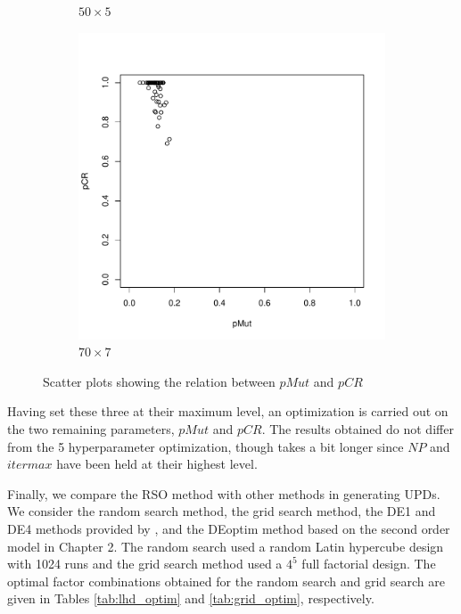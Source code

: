 \documentclass [PhD] {package/uclathes}
\begin{document}
\begin{figure}
\begin{subfigure}[b]{0.3\textwidth}
\caption{$50\times 5$}
\end{subfigure}
\begin{subfigure}[b]{0.3\textwidth}
\includegraphics{chapters/RSO/pdfs/scatter70}
\caption{$70\times 7$}
\end{subfigure}
\caption{Scatter plots showing the relation between $pMut$ and $pCR$}
\label{fig:scatter}
\end{figure}

Having set these three at their maximum level, an optimization is carried out on the two remaining parameters, $pMut$ and $pCR$. The results obtained do not differ from the 5 hyperparameter optimization, though takes a bit longer since $NP$ and $itermax$ have been held at their highest level.

Finally, we compare the RSO method with other methods in generating UPDs.
We consider the random search method, the grid search method, the DE1 and DE4 methods provided by \textcite{stokes2023metaheuristic}, and the DEoptim method based on the second order model in Chapter 2. The random search used a random Latin hypercube design with 1024 runs and the grid search method used a $4^5$ full factorial design. The optimal factor combinations obtained for the random search and grid search are given in Tables \ref{tab:lhd_optim} and \ref{tab:grid_optim}, respectively.
\end{document}
